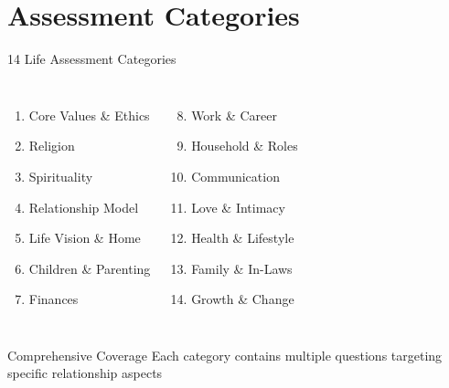 \documentclass[aspectratio=169]{beamer}
\begin{document}
\section{Assessment Categories}
\begin{frame}{14 Life Assessment Categories}
    \begin{columns}[T]
        \begin{enumerate}
            \item \textcolor{googleblue}{Core Values \& Ethics}
            \item \textcolor{googlegreen}{Religion}
            \item \textcolor{googlered}{Spirituality}
            \item \textcolor{googleyellow}{Relationship Model}
            \item \textcolor{googleblue}{Life Vision \& Home}
            \item \textcolor{googlegreen}{Children \& Parenting}
            \item \textcolor{googlered}{Finances}
        \end{enumerate}
        
        \begin{enumerate}
            \setcounter{enumi}{7}
            \item \textcolor{googleyellow}{Work \& Career}
            \item \textcolor{googleblue}{Household \& Roles}
            \item \textcolor{googlegreen}{Communication}
            \item \textcolor{googlered}{Love \& Intimacy}
            \item \textcolor{googleyellow}{Health \& Lifestyle}
            \item \textcolor{googleblue}{Family \& In-Laws}
            \item \textcolor{googlegreen}{Growth \& Change}
        \end{enumerate}
    \end{columns}
    
    \vspace{0.4cm}
    \begin{alertblock}{Comprehensive Coverage}
        Each category contains multiple questions targeting specific relationship aspects
    \end{alertblock}
\end{frame}
\end{document}

